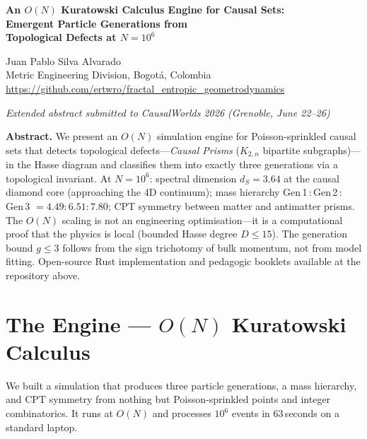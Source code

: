 \documentclass[11pt,a4paper]{article}
\begin{document}
\begin{center}
  {\Large\bfseries An $O(N)$ Kuratowski Calculus Engine for Causal Sets:\\[2pt]
  Emergent Particle Generations from\\[2pt]
  Topological Defects at $N = 10^6$}

  \medskip
  {\normalsize Juan Pablo Silva Alvarado}\\
  {\small Metric Engineering Division, Bogot\'{a}, Colombia}\\
  {\small\url{https://github.com/ertwro/fractal_entropic_geometrodynamics}}

  \medskip
  {\small\itshape Extended abstract submitted to CausalWorlds 2026 (Grenoble, June 22--26)}
\end{center}

\medskip


\textbf{Abstract.}
We present an $O(N)$ simulation engine for Poisson-sprinkled causal sets
that detects topological defects---\emph{Causal Prisms} ($K_{2,n}$ bipartite
subgraphs)---in the Hasse diagram and classifies them into exactly three
generations via a topological invariant.
At $N = 10^6$: spectral dimension $d_S = 3.64$ at the causal diamond core
(approaching the 4D continuum); mass hierarchy
Gen\,1\,:\,Gen\,2\,:\,Gen\,3 $= 4.49 : 6.51 : 7.80$;
CPT symmetry between matter and antimatter prisms.
The $O(N)$ scaling is not an engineering optimisation---it is
a computational proof that the physics is local
(bounded Hasse degree $D \leq 15$).
The generation bound $g \leq 3$ follows from the sign trichotomy of bulk
momentum, not from model fitting.
Open-source Rust implementation and pedagogic booklets available at
the repository above.

\section{The Engine --- $O(N)$ Kuratowski Calculus}

We built a simulation that produces three particle generations, a mass
hierarchy, and CPT symmetry from nothing but Poisson-sprinkled points and
integer combinatorics.  It runs at $O(N)$ and processes $10^6$ events in
63\,seconds on a standard laptop.
\end{document}
